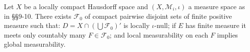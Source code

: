 Let $X$ be a locally compact Hausdorff space and $(X, \mathcal{M}_i, \iota)$ a measure space as in \S\S 9-10. There exists $\mathcal{F}_0$ of compact pairwise disjoint sets of finite positive measure such that: $D = X \cap (\bigcup \mathcal{F}_0)'$ is locally $\iota$-null; if $E$ has finite measure it meets only countably many $F \in \mathcal{F}_0$; and local measurability on each $F$ implies global measurability.
